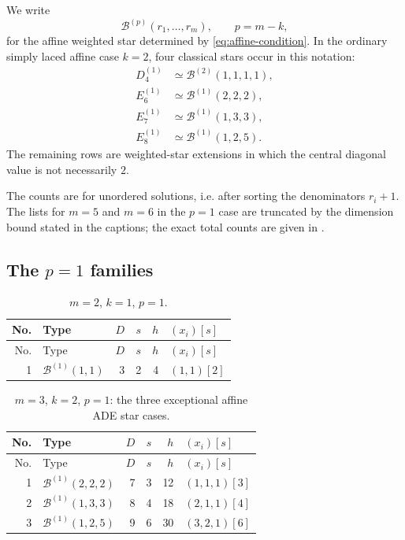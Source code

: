 \documentclass[11pt,a4paper]{article}
\newcommand{\Ber}{\mathcal B}
\theoremstyle{definition}
\theoremstyle{plain}
\begin{document}
We write
\begin{equation}
        \Ber^{(p)}(r_1,\ldots,r_m),
        \qquad p=m-k,
\end{equation}
for the affine weighted star determined by \eqref{eq:affine-condition}.  In the ordinary simply laced affine case $k=2$, four classical stars occur in this notation:
\begin{align*}
D_4^{(1)} &\simeq \Ber^{(2)}(1,1,1,1),\\
E_6^{(1)} &\simeq \Ber^{(1)}(2,2,2),\\
E_7^{(1)} &\simeq \Ber^{(1)}(1,3,3),\\
E_8^{(1)} &\simeq \Ber^{(1)}(1,2,5).
\end{align*}
The remaining rows are weighted-star extensions in which the central diagonal value is not necessarily $2$.  

The counts are for unordered solutions, i.e. after sorting the denominators $r_i+1$.  The lists for $m=5$ and $m=6$ in the $p=1$ case are truncated by the dimension bound stated in the captions; the exact total counts are given in .

\subsection{The \texorpdfstring{$p=1$}{p=1} families}

\begin{longtable}{@{}r l r r r l@{}}
\caption{$m=2$, $k=1$, $p=1$.}\label{tab:m2p1}\\
\toprule
No. & Type & $D$ & $s$ & $h$ & $(x_i)[s]$\\
\midrule
\endfirsthead
\toprule
No. & Type & $D$ & $s$ & $h$ & $(x_i)[s]$\\
\midrule
\endhead
1 & $\Ber^{(1)}(1,1)$ & 3 & 2 & 4 & $(1,1)[2]$ \\
\bottomrule
\end{longtable}

\begin{longtable}{@{}r l r r r l@{}}
\caption{$m=3$, $k=2$, $p=1$: the three exceptional affine ADE star cases.}\label{tab:m3p1}\\
\toprule
No. & Type & $D$ & $s$ & $h$ & $(x_i)[s]$\\
\midrule
\endfirsthead
\toprule
No. & Type & $D$ & $s$ & $h$ & $(x_i)[s]$\\
\midrule
\endhead
1 & $\Ber^{(1)}(2,2,2)$ & 7 & 3 & 12 & $(1,1,1)[3]$ \\
2 & $\Ber^{(1)}(1,3,3)$ & 8 & 4 & 18 & $(2,1,1)[4]$ \\
3 & $\Ber^{(1)}(1,2,5)$ & 9 & 6 & 30 & $(3,2,1)[6]$ \\
\bottomrule
\end{longtable}
\end{document}
